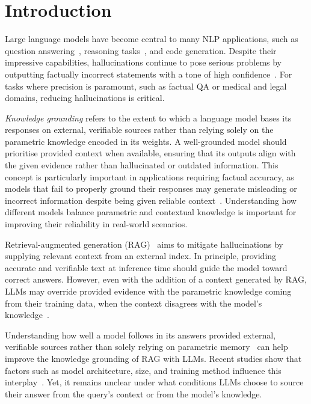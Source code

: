\section{Introduction}

Large language models have become central to many NLP applications, such as question answering~\cite{gpt3,how_can_we_know}, reasoning tasks~\cite{treeofthoughts}, and code generation\cite{alphacode_generation}.
Despite their impressive capabilities, hallucinations continue to pose serious problems by outputting factually incorrect statements with a tone of high confidence~\cite{how_can_we_know}.
For tasks where precision is paramount, such as factual QA or medical and legal domains, reducing hallucinations is critical\cite{mitigating_hallucinations}.

\emph{Knowledge grounding} refers to the extent to which a language model bases its responses on external, verifiable sources rather than relying solely on the parametric knowledge encoded in its weights. 
A well-grounded model should prioritise provided context when available, ensuring that its outputs align with the given evidence rather than hallucinated or outdated information. 
This concept is particularly important in applications requiring factual accuracy, as models that fail to properly ground their responses may generate misleading or incorrect information despite being given reliable context~\cite{rag,factual_recall}.
Understanding how different models balance parametric and contextual knowledge is important for improving their reliability in real-world scenarios.

Retrieval-augmented generation (RAG)~\cite{rag} aims to mitigate hallucinations by supplying relevant context from an external index.
In principle, providing accurate and verifiable text at inference time should guide the model toward correct answers.
However, even with the addition of a context generated by RAG, LLMs may override provided evidence with the parametric knowledge coming from their training data, %
when the context disagrees with the model's knowledge~\cite{factual_recall,ragged}.

Understanding how well a model follows in its answers provided external, verifiable sources rather than solely relying on parametric memory~\cite{rag} can help improve the knowledge grounding of RAG with LLMs. 
Recent studies show that factors such as model architecture, size, and training method influence this interplay~\cite{factual_recall,flant5,llama}.
Yet, it remains unclear under what conditions LLMs choose to source their answer from the query's context or from the model's knowledge.

